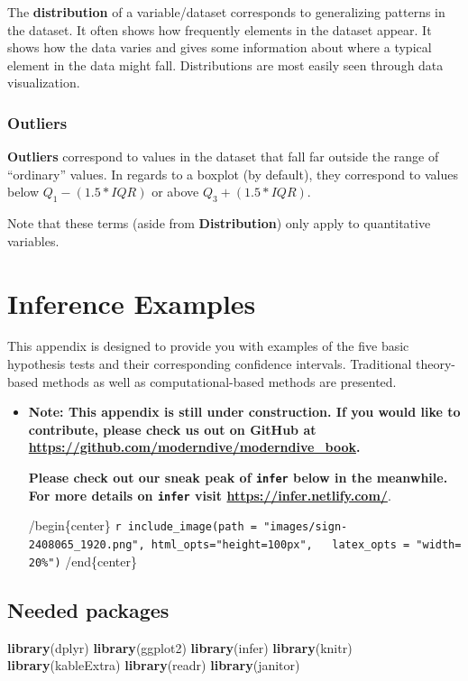 \documentclass[12pt,]{krantz}
\makeatletter
\newenvironment{Shaded}{\begin{snugshade}}{\end{snugshade}}
\newcommand{\KeywordTok}[1]{\textcolor[rgb]{0.27,0.27,0.27}{\textbf{#1}}}
\newcommand{\NormalTok}[1]{#1}
\newenvironment{kframe}{%
\medskip{}
\setlength{\fboxsep}{.8em}
 \def\at@end@of@kframe{}%
 \ifinner\ifhmode%
  \def\at@end@of@kframe{\end{minipage}}%
  \begin{minipage}{\columnwidth}%
 \fi\fi%
 \def\FrameCommand##1{\hskip\@totalleftmargin \hskip-\fboxsep
 \colorbox{shadecolor}{##1}\hskip-\fboxsep
     \hskip-\linewidth \hskip-\@totalleftmargin \hskip\columnwidth}%
 \MakeFramed {\advance\hsize-\width
   \@totalleftmargin\z@ \linewidth\hsize
   \@setminipage}}%
 {\par\unskip\endMakeFramed%
 \at@end@of@kframe}
\renewenvironment{Shaded}{\begin{kframe}}{\end{kframe}}
\newenvironment{rmdblock}[1]
  {\begin{shaded*}
  \begin{itemize}
  \renewcommand{\labelitemi}{
    \raisebox{-.7\height}[0pt][0pt]{
    }
  }
  \item
  }
  {
  \end{itemize}
  \end{shaded*}
  }
\newenvironment{learncheck}
  {\begin{rmdblock}{warning}}
  {\end{rmdblock}}
\theoremstyle{definition}
\theoremstyle{definition}
\theoremstyle{definition}
\theoremstyle{remark}
\makeatother
\begin{document}
The \textbf{distribution} of a variable/dataset corresponds to
generalizing patterns in the dataset. It often shows how frequently
elements in the dataset appear. It shows how the data varies and gives
some information about where a typical element in the data might fall.
Distributions are most easily seen through data visualization.

\subsection{Outliers}\label{outliers}

\textbf{Outliers} correspond to values in the dataset that fall far
outside the range of ``ordinary'' values. In regards to a boxplot (by
default), they correspond to values below \(Q_1 - (1.5 * IQR)\) or above
\(Q_3 + (1.5 * IQR)\).

Note that these terms (aside from \textbf{Distribution}) only apply to
quantitative variables.

\chapter{Inference Examples}\label{appendixB}

This appendix is designed to provide you with examples of the five basic
hypothesis tests and their corresponding confidence intervals.
Traditional theory-based methods as well as computational-based methods
are presented.

\begin{learncheck}
\textbf{Note: This appendix is still under construction. If you would
like to contribute, please check us out on GitHub at
\url{https://github.com/moderndive/moderndive_book}.}

\textbf{Please check out our sneak peak of \texttt{infer} below in the
meanwhile. For more details on \texttt{infer} visit
\url{https://infer.netlify.com/}}.

/begin\{center\}
\texttt{r\ include\_image(path\ =\ "images/sign-2408065\_1920.png",\ html\_opts="height=100px",\ \ \ latex\_opts\ =\ "width=20\%")}
/end\{center\}
\end{learncheck}

\section*{Needed packages}\label{needed-packages-10}


\begin{Shaded}
\begin{Highlighting}[]
\KeywordTok{library}\NormalTok{(dplyr)}
\KeywordTok{library}\NormalTok{(ggplot2)}
\KeywordTok{library}\NormalTok{(infer)}
\KeywordTok{library}\NormalTok{(knitr)}
\KeywordTok{library}\NormalTok{(kableExtra)}
\KeywordTok{library}\NormalTok{(readr)}
\KeywordTok{library}\NormalTok{(janitor)}
\end{Highlighting}
\end{Shaded}
\end{document}
